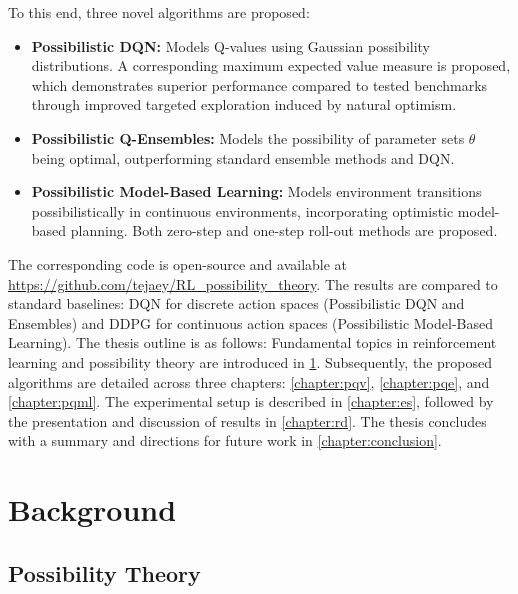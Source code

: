 \documentclass[11pt,a4paper]{report}
\begin{document}
To this end, three novel algorithms are proposed:
\begin{itemize}
    \item \textbf{Possibilistic DQN:} Models Q-values using Gaussian possibility distributions. A corresponding maximum expected value measure is proposed, which demonstrates superior performance compared to tested benchmarks through improved targeted exploration induced by natural optimism.
    \item \textbf{Possibilistic Q-Ensembles:} Models the possibility of parameter sets $\theta$ being optimal, outperforming standard ensemble methods and DQN.
    \item \textbf{Possibilistic Model-Based Learning:} Models environment transitions possibilistically in continuous environments, incorporating optimistic model-based planning. Both zero-step and one-step roll-out methods are proposed.
\end{itemize}
\par

The corresponding code is open-source and available at \url{https://github.com/tejaey/RL_possibility_theory}. The results are compared to standard baselines: DQN for discrete action spaces (Possibilistic DQN and Ensembles) and DDPG for continuous action spaces (Possibilistic Model-Based Learning). The thesis outline is as follows: Fundamental topics in reinforcement learning and possibility theory are introduced in \ref{chapter:backgrdound}. Subsequently, the proposed algorithms are detailed across three chapters: \ref{chapter:pqv}, \ref{chapter:pqe}, and \ref{chapter:pqml}. The experimental setup is described in \ref{chapter:es}, followed by the presentation and discussion of results in \ref{chapter:rd}. The thesis concludes with a summary and directions for future work in \ref{chapter:conclusion}.


\chapter{Background} \label{chapter:backgrdound}

\section{Possibility Theory}
\end{document}
